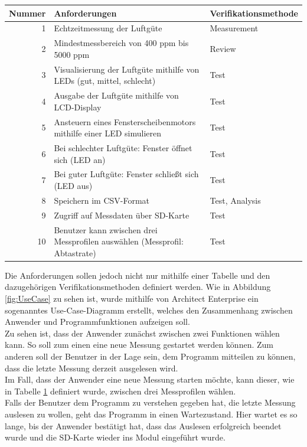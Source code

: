\begin{table}[!hbt]
	
	\centering
	
	\begin{tabular}{|r| p{8.4cm}|p{4.7cm}|}
		
		\hline
		Nummer & Anforderungen & Verifikationsmethode \\
		\hline
		1 & Echtzeitmessung der Luftgüte & Measurement \\
		\hline
		2 & Mindestmessbereich von 400 ppm bis 5000 ppm & Review \\
		\hline
		3 & Visualisierung der Luftgüte mithilfe von \ac{LED}s (gut, mittel, schlecht) & Test \\
		\hline
		4 & Ausgabe der Luftgüte mithilfe von \ac{LCD}-Display & Test \\
		\hline
		5 & Ansteuern eines Fensterscheibenmotors mithilfe einer \ac{LED} simulieren & Test \\
		\hline
		6 & Bei schlechter Luftgüte: Fenster öffnet sich (\ac{LED} an) & Test \\
		\hline
		7 & Bei guter Luftgüte: Fenster schließt sich (\ac{LED} aus) & Test \\
		\hline
		8 & Speichern im CSV-Format & Test, Analysis\\
		\hline
		9 & Zugriff auf Messdaten über SD-Karte & Test \\
		\hline
		10 & Benutzer kann zwischen drei Messprofilen auswählen (Messprofil: Abtastrate) & Test \\
		\hline
		
	\end{tabular}
	
	\label{tab:Anforderungen}
	
\end{table}

Die Anforderungen sollen jedoch nicht nur mithilfe einer Tabelle und den dazugehörigen Verifikationsmethoden definiert werden. Wie in Abbildung \ref{fig:UseCase} zu sehen ist, wurde mithilfe von Architect Enterprise ein sogenanntes Use-Case-Diagramm erstellt, welches den Zusammenhang zwischen Anwender und Programmfunktionen aufzeigen soll. \\
Zu sehen ist, dass der Anwender zunächst zwischen zwei Funktionen wählen kann. So soll zum einen eine neue Messung gestartet werden können. Zum anderen soll der Benutzer in der Lage sein, dem Programm mitteilen zu können, dass die letzte Messung derzeit ausgelesen wird. \\
Im Fall, dass der Anwender eine neue Messung starten möchte, kann dieser, wie in Tabelle \ref{tab:Anforderungen} definiert wurde, zwischen drei Messprofilen wählen. \\
Falls der Benutzer dem Programm zu verstehen gegeben hat, die letzte Messung auslesen zu wollen, geht das Programm in einen Wartezustand. Hier wartet es so lange, bis der Anwender bestätigt hat, dass das Auslesen erfolgreich beendet wurde und die SD-Karte wieder ins Modul eingeführt wurde. \\

